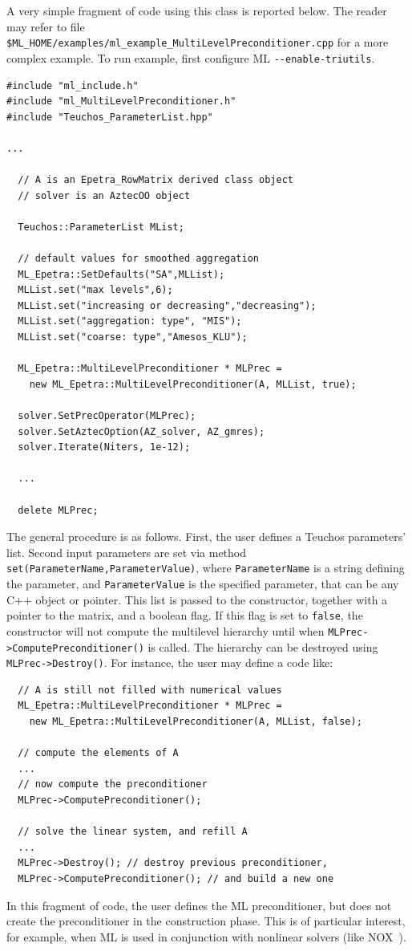 A very simple fragment of code using this class is reported below.
The reader may refer to file
\verb!$ML_HOME/examples/ml_example_MultiLevelPreconditioner.cpp! for a more
complex example. To run example, first 
configure ML \verb!--enable-triutils!.
\begin{verbatim}
#include "ml_include.h"
#include "ml_MultiLevelPreconditioner.h"
#include "Teuchos_ParameterList.hpp"

...

  // A is an Epetra_RowMatrix derived class object
  // solver is an AztecOO object

  Teuchos::ParameterList MList;

  // default values for smoothed aggregation
  ML_Epetra::SetDefaults("SA",MLList);
  MLList.set("max levels",6);
  MLList.set("increasing or decreasing","decreasing");
  MLList.set("aggregation: type", "MIS");
  MLList.set("coarse: type","Amesos_KLU");
  
  ML_Epetra::MultiLevelPreconditioner * MLPrec = 
    new ML_Epetra::MultiLevelPreconditioner(A, MLList, true);

  solver.SetPrecOperator(MLPrec);
  solver.SetAztecOption(AZ_solver, AZ_gmres);
  solver.Iterate(Niters, 1e-12);

  ...

  delete MLPrec;
\end{verbatim}
The general procedure is as follows. First, the user defines a Teuchos
parameters' list. Second input parameters are set via method
\verb!set(ParameterName,ParameterValue)!, where \verb!ParameterName! is
a string defining the parameter, and \verb!ParameterValue! is the
specified parameter, that can be any C++ object or pointer.  This list
is passed to the constructor, together with a pointer to the matrix, and
a boolean flag.  If this flag is set to \verb!false!, the constructor
will not compute the multilevel hierarchy until when
\verb!MLPrec->ComputePreconditioner()! is called. The hierarchy can be
destroyed using \verb!MLPrec->Destroy()!.  For instance, the user may
define a code like:
\begin{verbatim}
  // A is still not filled with numerical values
  ML_Epetra::MultiLevelPreconditioner * MLPrec = 
    new ML_Epetra::MultiLevelPreconditioner(A, MLList, false);
  
  // compute the elements of A
  ...
  // now compute the preconditioner
  MLPrec->ComputePreconditioner();

  // solve the linear system, and refill A
  ...
  MLPrec->Destroy(); // destroy previous preconditioner,
  MLPrec->ComputePreconditioner(); // and build a new one
\end{verbatim}
In this fragment of code, the user defines the ML preconditioner, but
does not create the preconditioner in the construction phase. This is of
particular interest, for example, when ML is used in conjunction with
nonlinear solvers (like NOX~\cite{NOX-home-page}).

